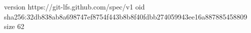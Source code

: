 version https://git-lfs.github.com/spec/v1
oid sha256:32db838ab8a698747ef8754f443b8b8f40fdbb274059943ee16a887885458809
size 62
